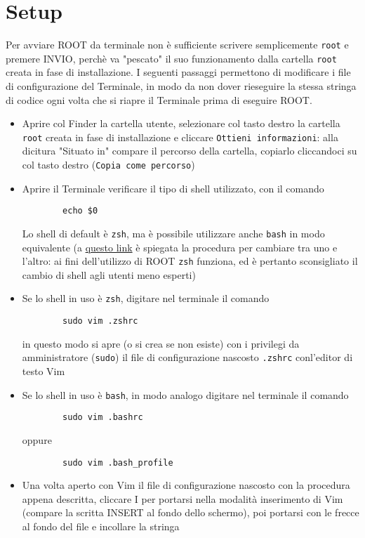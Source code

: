 \section{Setup}
Per avviare ROOT da terminale non è sufficiente scrivere semplicemente \texttt{root} e premere INVIO, perchè va "pescato" il suo funzionamento dalla cartella \texttt{root} creata in fase di installazione. I seguenti passaggi permettono di modificare i file di configurazione del Terminale, in modo da non dover rieseguire la stessa stringa di codice ogni volta che si riapre il Terminale prima di eseguire ROOT.
\begin{itemize}
	\item Aprire col Finder la cartella utente, selezionare col tasto destro la cartella \texttt{root} creata in fase di installazione e cliccare \texttt{Ottieni informazioni}: alla dicitura "Situato in" compare il percorso della cartella, copiarlo cliccandoci su col tasto destro (\texttt{Copia come percorso})
	\item Aprire il Terminale verificare il tipo di shell utilizzato, con il comando
	\begin{verbatim}
		echo $0
	\end{verbatim}
	Lo shell di default è \texttt{zsh}, ma è possibile utilizzare anche \texttt{bash} in modo equivalente (a \hyperref{https://www.howtogeek.com/444596/how-to-change-the-default-shell-to-bash-in-macos-catalina/}{}{}{questo link} è spiegata la procedura per cambiare tra uno e l'altro: ai fini dell'utilizzo di ROOT \texttt{zsh} funziona, ed è pertanto sconsigliato il cambio di shell agli utenti meno esperti)
	\item Se lo shell in uso è \texttt{zsh}, digitare nel terminale il comando
	\begin{verbatim}
		sudo vim .zshrc
	\end{verbatim}
	in questo modo si apre (o si crea se non esiste) con i privilegi da amministratore (\texttt{sudo}) il file di configurazione nascosto \texttt{.zshrc} conl'editor di testo Vim
	\item Se lo shell in uso è \texttt{bash}, in modo analogo digitare nel terminale il comando
	\begin{verbatim}
		sudo vim .bashrc
	\end{verbatim}
	oppure
	\begin{verbatim}
		sudo vim .bash_profile
	\end{verbatim}
	\item Una volta aperto con Vim il file di configurazione nascosto con la procedura appena descritta, cliccare I per portarsi nella modalità inserimento di Vim (compare la scritta INSERT al fondo dello schermo), poi portarsi con le frecce al fondo del file e incollare la stringa

\end{itemize}
